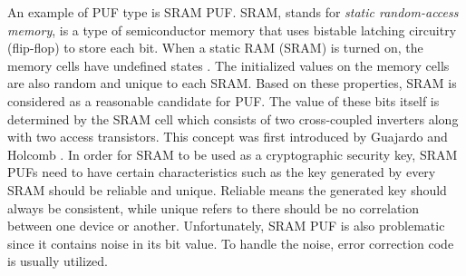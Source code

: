 An example of PUF type is SRAM PUF. SRAM, stands for \textit{static random-access memory}, is a type of semiconductor memory that uses bistable latching circuitry (flip-flop) to store each bit. When a static RAM (SRAM) is turned on, the memory cells have undefined states \cite{tuyls_2010}. The initialized values on the memory cells are also random and unique to each SRAM. Based on these properties, SRAM is considered as a reasonable candidate for PUF. The value of these bits itself is determined by the SRAM cell which consists of two cross-coupled inverters along with two access transistors. This concept was first introduced by Guajardo and Holcomb  \cite{guajardo_kumar_schrijen_tuyls}. In order for SRAM to be used as a cryptographic security key, SRAM PUFs need to have certain characteristics such as the key generated by every SRAM should be reliable and unique. Reliable means the generated key should always be consistent, while unique refers to there should be no correlation between one device or another.
Unfortunately, SRAM PUF is also problematic since it contains noise in its bit value. To handle the noise, error correction code is usually utilized.



